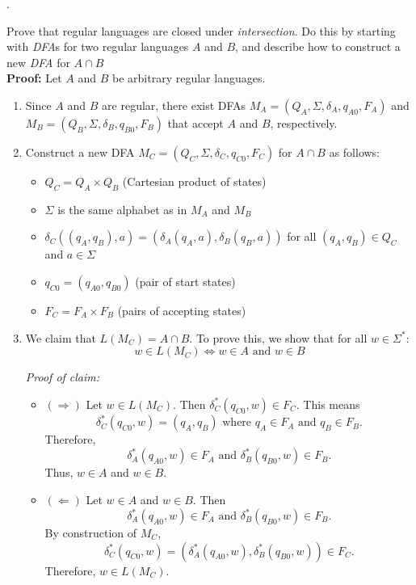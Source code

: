 \documentclass[12pt]{article}
\newcounter{quesnum}
\newcommand{\question}[2][??]{
\begin{list}{\labelitemi}{\leftmargin=2em}
\item [\arabic{quesnum}.] {} {#2}
\end{list}
\addtocounter{quesnum}{1}
}
\begin{document}
\vspace{12pt}

\question[3]{
Prove that regular languages are closed under \emph{intersection}. Do this by starting with \emph{DFA}s for two regular languages $A$ and $B$, and describe how to construct a new \emph{DFA} for $A \cap B$\
\\

\textbf{Proof:}  
Let $A$ and $B$ be arbitrary regular languages.

\begin{enumerate}
    \item Since $A$ and $B$ are regular, there exist DFAs $M_A = (Q_A, \Sigma, \delta_A, q_{A0}, F_A)$ and $M_B = (Q_B, \Sigma, \delta_B, q_{B0}, F_B)$ that accept $A$ and $B$, respectively.
    
    \item Construct a new DFA $M_C = (Q_C, \Sigma, \delta_C, q_{C0}, F_C)$ for $A \cap B$ as follows:
    \begin{itemize}
        \item $Q_C = Q_A \times Q_B$ (Cartesian product of states)
        \item $\Sigma$ is the same alphabet as in $M_A$ and $M_B$
        \item $\delta_C((q_A, q_B), a) = (\delta_A(q_A, a), \delta_B(q_B, a))$ for all $(q_A, q_B) \in Q_C$ and $a \in \Sigma$
        \item $q_{C0} = (q_{A0}, q_{B0})$ (pair of start states)
        \item $F_C = F_A \times F_B$ (pairs of accepting states)
    \end{itemize}
    
    \item We claim that $L(M_C) = A \cap B$. To prove this, we show that for all $w \in \Sigma^*$:
    $$w \in L(M_C) \iff w \in A \text{ and } w \in B$$
    
    \textit{Proof of claim:}
    \begin{itemize}
        \item $(\Rightarrow)$ Let $w \in L(M_C)$. Then $\delta_C^*(q_{C0}, w) \in F_C$.
        This means 
        $$\delta_C^*(q_{C0}, w) = (q_A, q_B) \text{ where } q_A \in F_A \text{ and } q_B \in F_B.$$
        Therefore, 
        $$\delta_A^*(q_{A0}, w) \in F_A \text{ and } \delta_B^*(q_{B0}, w) \in F_B.$$
        Thus, $w \in A$ and $w \in B$.
        
        \item $(\Leftarrow)$ Let $w \in A$ and $w \in B$. Then 
        $$\delta_A^*(q_{A0}, w) \in F_A \text{ and } \delta_B^*(q_{B0}, w) \in F_B.$$
        By construction of $M_C$,
        $$\delta_C^*(q_{C0}, w) = (\delta_A^*(q_{A0}, w), \delta_B^*(q_{B0}, w)) \in F_C.$$
        Therefore, $w \in L(M_C)$.
    \end{itemize}
    

\end{enumerate}}
\end{document}
